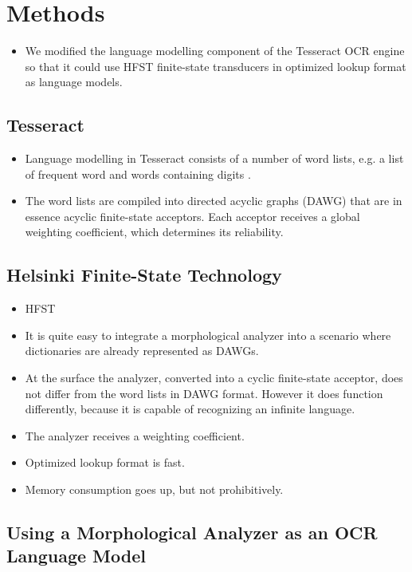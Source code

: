\documentclass[b5paper]{article}
\begin{document}
\section{Methods}
\begin{itemize}
\item We modified the language modelling component of the Tesseract
  OCR engine so that it could use HFST finite-state transducers in
  optimized lookup format \cite{silfverberg09} as language models.
\end{itemize}

\subsection{Tesseract}
\begin{itemize}
\item Language modelling in Tesseract consists of a number of word
  lists, e.g. a list of frequent word and words containing digits
  \cite{smith07}.
\item The word lists are compiled into directed acyclic graphs (DAWG)
  that are in essence acyclic finite-state acceptors. Each acceptor
  receives a global weighting coefficient, which determines its
  reliability.
\end{itemize}
\subsection{Helsinki Finite-State Technology}
\begin{itemize}
\item HFST \cite{linden13}
\item It is quite easy to integrate a morphological analyzer into a
  scenario where dictionaries are already represented as DAWGs.
\item At the surface the analyzer, converted into a cyclic
  finite-state acceptor, does not differ from the word lists in DAWG
  format. However it does function differently, because it is capable
  of recognizing an infinite language.
\item The analyzer receives a weighting coefficient.
\item Optimized lookup format is fast.
\item Memory consumption goes up, but not prohibitively.
\end{itemize}

\subsection{Using a Morphological Analyzer as an OCR Language Model}
\end{document}
